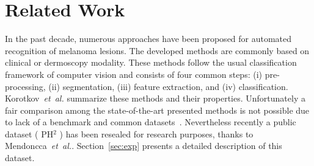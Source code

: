 \section{Related Work}
\label{sec:rw}
In the past decade, numerous approaches have been proposed for automated recognition of melanoma lesions.
The developed methods are commonly based on clinical or dermoscopy modality.
These methods follow the usual classification framework of computer vision and consists of four common steps: (i) pre-processing, (ii) segmentation, (iii) feature extraction, and (iv) classification.
Korotkov~\emph{et~al.}\cite{korotkov2012computerized} summarize these methods and their properties.
Unfortunately a fair comparison among the state-of-the-art presented methods is not possible due to lack of a benchmark and common datasets~\cite{rastgoo2015automatic,korotkov2012computerized}.
Nevertheless recently a public dataset ( PH$^{2}$ ) has been resealed for research purposes, thanks to Mendoncca~\emph{et~al.}\cite{mendoncca2013ph}.
Section~\ref{sec:exp} presents a detailed description of this dataset.

